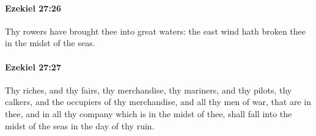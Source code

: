 		\paragraph{Ezekiel 27:26} %
			\label{EZEKIEL-27-26}

			Thy rowers have brought thee into great waters: the east wind hath broken thee in the midst of the seas.


		\paragraph{Ezekiel 27:27} %
			\label{EZEKIEL-27-27}

			Thy riches, and thy fairs, thy merchandise, thy mariners, and thy pilots, thy calkers, and the occupiers of thy merchandise, and all thy men of war, that are in thee, and in all thy company which is in the midst of thee, shall fall into the midst of the seas in the day of thy ruin.

